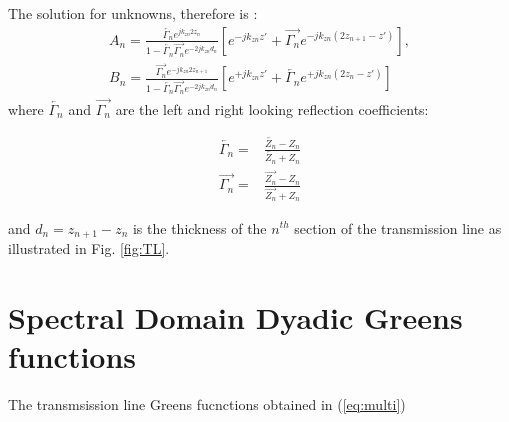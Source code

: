 \documentclass[11pt]{article}
\renewcommand{\^}{\hat}  %
\begin{document}
    The solution for unknowns, therefore is \cite[p. 1178]{michalski2005electromagnetic}:
    \begin{subequations}
      \begin{align}
        A_n = \frac{\overleftarrow{\Gamma_n} e^{j k_{zn} 2z_n }}
        {1-\overleftarrow{\Gamma_n} \overrightarrow{\Gamma_n} e^{-2j k_{zn} d_{n} }}
        \left[ e^{-j k_{zn} z'} + \overrightarrow{\Gamma_n} e^{-j k_{zn} (2z_{n+1} -z')} \right],\\
        B_n = \frac{\overrightarrow{\Gamma_n} e^{-j k_{zn} 2z_{n+1} }}
        {1-\overleftarrow{\Gamma_n} \overrightarrow{\Gamma_n} e^{-2j k_{zn} d_{n} }}
        \left[ e^{+j k_{zn} z'} + \overleftarrow{\Gamma_n} e^{+j k_{zn} (2z_n -z')} \right]
        \label{eq:AnB}
      \end{align}
    \end{subequations}
    where $\overleftarrow{\Gamma_n}$ and $\overrightarrow{\Gamma_n}$ are the left and right looking reflection coefficients:

    \begin{subequations}
      \begin{align}
        \overleftarrow{\Gamma_n} ={}& \frac{\overleftarrow{Z_n} - Z_n}{\overleftarrow{Z_n} + Z_n}
        \label{eq:R_left}\\
        \overrightarrow{\Gamma_n} ={}& \frac{\overrightarrow{Z_n} - Z_n}{\overrightarrow{Z_n} + Z_n}
        \label{eq:R_right}
      \end{align}
      \label{eq:R}
    \end{subequations}

    and $d_n = z_{n+1} - z_n$ is the thickness of the $n^{th}$ section of the transmission line as illustrated in Fig. \ref{fig:TL}.

    \section{Spectral Domain Dyadic Greens functions}

    The transmsission line Greens fucnctions obtained in (\ref{eq:multi})

    \clearpage %
    
    

  
\end{document}
